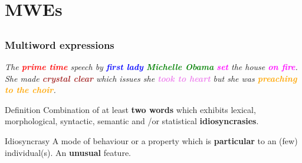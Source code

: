 \documentclass[xcolor=dvipsnames]{beamer}
\begin{document}
\begin{frame}

\end{frame}

\section{MWEs} 
\subsection{}

\begin{frame}
  \frametitle{Multiword expressions}

\begin{block}{}
\textit{The \textcolor{red}{\textbf{prime time}} speech by \textcolor{blue}{\textbf{first lady}} \textcolor{green}{\textbf{Michelle Obama}} \textcolor{magenta}{\textbf{set}} the house \textcolor{magenta}{\textbf{on fire}}. She made \textcolor{brown}{\textbf{crystal clear}} which issues she \textcolor{violet}{\textbf{took to heart}} but she was \textcolor{orange}{\textbf{preaching to the choir}}.}
\end{block}

\begin{block}{Definition \cite{baldwin-kim:2010:handbook}}
Combination of at least \textbf{two words} which exhibits lexical, morphological, syntactic, semantic and /or statistical \textbf{idiosyncrasies}.
\end{block}

\begin{block}{Idiosyncrasy}
A mode of behaviour or a property which is \textbf{particular} to an (few) individual(s). An \textbf{unusual} feature.
\end{block}


\end{frame}
\end{document}
